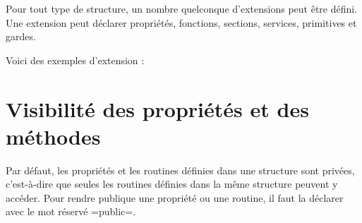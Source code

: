Pour tout type de structure, un nombre quelconque d'extensions peut être défini. Une extension peut déclarer propriétés, fonctions, sections, services, primitives et gardes.

Voici des exemples d'extension :







\section{Visibilité des propriétés et des méthodes}

Par défaut, les propriétés et les routines définies dans une structure sont privées, c'est-à-dire que seules les routines définies dans la même structure peuvent y accéder. Pour rendre publique une propriété ou une routine, il faut la déclarer avec le mot réservé \plm=public=.


